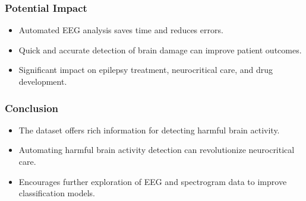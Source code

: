 \documentclass[leqno]{beamer}
\begin{document}


\begin{frame}
\frametitle{Potential Impact}
\begin{itemize}
\item Automated EEG analysis saves time and reduces errors.
\bigskip
\item Quick and accurate detection of brain damage can improve patient outcomes.
\bigskip
\item Significant impact on epilepsy treatment, neurocritical care,
and drug development.
\end{itemize}
\end{frame}


\begin{frame}
\frametitle{Conclusion}
\begin{itemize}
\item The dataset offers rich information for detecting harmful brain activity.
\bigskip
\item Automating harmful brain activity detection can revolutionize
neurocritical care.
\bigskip
\item Encourages further exploration of EEG and spectrogram data to
improve classification models.
\end{itemize}
\end{frame}


%
%
\end{document}
